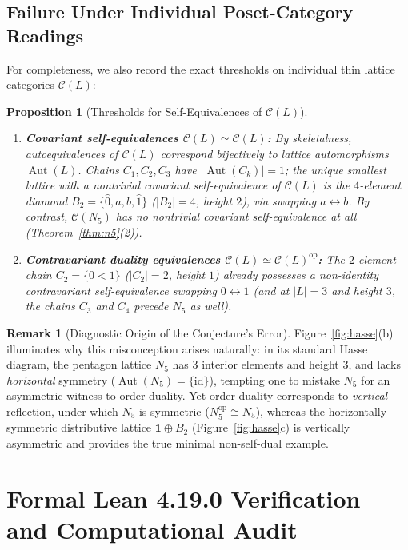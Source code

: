 \documentclass[11pt]{article}
\newtheorem{proposition}[theorem]{Proposition}
\theoremstyle{definition}
\newtheorem{remark}[theorem]{Remark}
\newcommand{\CatC}{\mathcal{C}}
\newcommand{\op}{\mathrm{op}}
\newcommand{\Aut}{\operatorname{Aut}}
\begin{document}
\subsection{Failure Under Individual Poset-Category Readings}

For completeness, we also record the exact thresholds on individual thin lattice
categories $\CatC(L)$:

\begin{proposition}[Thresholds for Self-Equivalences of $\CatC(L)$]
\label{prop:thin-readings}
\leavevmode
\begin{enumerate}
  \item \textbf{Covariant self-equivalences $\CatC(L) \simeq \CatC(L)$:} By
  skeletalness, autoequivalences of $\CatC(L)$ correspond bijectively to lattice
  automorphisms $\Aut(L)$. Chains $C_1, C_2, C_3$ have $|\Aut(C_k)| = 1$; the
  unique smallest lattice with a nontrivial covariant self-equivalence of
  $\CatC(L)$ is the $4$-element diamond $B_2 = \{\hat{0}, a, b, \hat{1}\}$
  ($|B_2| = 4$, height $2$), via swapping $a \leftrightarrow b$. By contrast,
  $\CatC(N_5)$ has \emph{no} nontrivial covariant self-equivalence at all
  (Theorem~\ref{thm:n5}(2)).
  \item \textbf{Contravariant duality equivalences $\CatC(L) \simeq \CatC(L)^{\op}$:}
  The $2$-element chain $C_2 = \{0 < 1\}$ ($|C_2| = 2$, height $1$) already
  possesses a non-identity contravariant self-equivalence swapping
  $0 \leftrightarrow 1$ (and at $|L| = 3$ and height $3$, the chains $C_3$ and
  $C_4$ precede $N_5$ as well).
\end{enumerate}
\end{proposition}

\begin{remark}[Diagnostic Origin of the Conjecture's Error]
Figure~\ref{fig:hasse}(b) illuminates why this misconception arises naturally:
in its standard Hasse diagram, the pentagon lattice $N_5$ has $3$ interior
elements and height $3$, and lacks \emph{horizontal} symmetry
($\Aut(N_5) = \{\mathrm{id}\}$), tempting one to mistake $N_5$ for an asymmetric
witness to order duality. Yet order duality corresponds to \emph{vertical}
reflection, under which $N_5$ is symmetric ($N_5^{\op} \cong N_5$), whereas the
horizontally symmetric distributive lattice $\mathbf{1} \oplus B_2$
(Figure~\ref{fig:hasse}c) is vertically asymmetric and provides the true minimal
non-self-dual example.
\end{remark}

\section{Formal Lean 4.19.0 Verification and Computational Audit}
\end{document}

